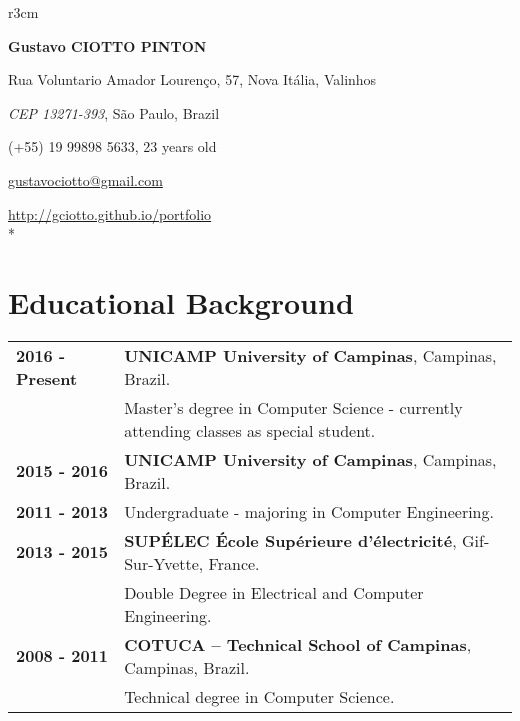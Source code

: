 \documentclass[10pt, a4paper]{article}
\author{Gustavo Ciotto Pinton}
\begin{document}
\pagestyle{empty} 

\begin{wrapfigure}{r}{3cm}
  \vspace{-20pt}
  \begin{center}
  \end{center}
\end{wrapfigure}

\textbf{\LARGE Gustavo CIOTTO PINTON}

Rua Voluntario Amador Lourenço, 57, Nova Itália, Valinhos

\textit{CEP 13271-393}, São Paulo, Brazil

(+55) 19 99898 5633, 23 years old

\url{gustavociotto@gmail.com} 

\url{http://gciotto.github.io/portfolio}\\*



\section{Educational Background}

\begin{tabular}{p{} p{}}

\textbf{2016 - Present} & \textbf{UNICAMP University of
 Campinas}, Campinas, Brazil.
\\
& Master's degree in Computer Science - currently attending classes as special
student.
\vspace{8pt}\\

 \textbf{2015 - 2016} & \textbf{UNICAMP University of
 Campinas}, Campinas, Brazil.
 \\
 \textbf{2011 - 2013} & Undergraduate -  majoring in
 Computer Engineering. \vspace{4pt}
 \\ 

 \textbf{2013 - 2015} & \textbf{SUPÉLEC  École Supérieure d'électricité},
 Gif-Sur-Yvette, France. \\
 & Double Degree in Electrical and Computer Engineering. \vspace{4pt}\\

 
 \textbf{2008 - 2011} & \textbf{COTUCA – Technical School of Campinas},
 Campinas, Brazil. \\
 & Technical degree in Computer Science. \\
\end{tabular}
\end{document}
